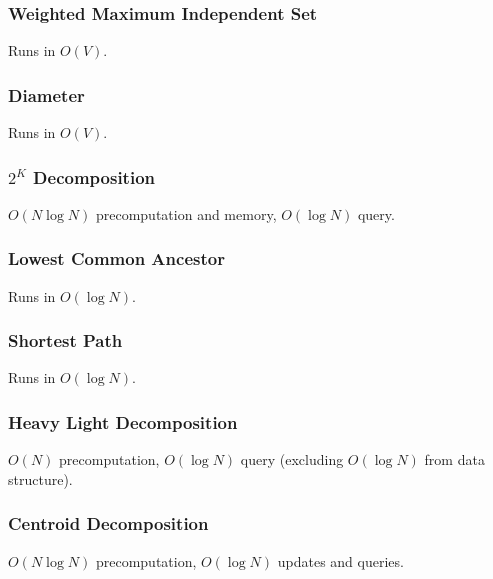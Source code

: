 \documentclass{article}
\begin{document}
\subsubsection{Weighted Maximum Independent Set}
Runs in $O(V)$.


\subsubsection{Diameter}
Runs in $O(V)$.


\subsubsection{$2^K$ Decomposition}
$O(N \log N)$ precomputation and memory, $O(\log N)$ query.


\subsubsection{Lowest Common Ancestor}
Runs in $O(\log N)$.


\subsubsection{Shortest Path}
Runs in $O(\log N)$.


\subsubsection{Heavy Light Decomposition}
$O(N)$ precomputation, $O(\log N)$ query (excluding $O(\log N)$ from data structure).


\subsubsection{Centroid Decomposition}
$O(N \log N)$ precomputation, $O(\log N)$ updates and queries.

\end{document}
